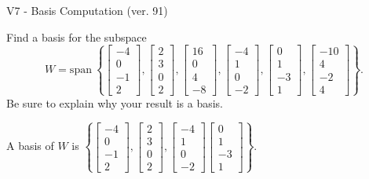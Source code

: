 \begin{exercise}
  \begin{exerciseTitle}V7 - Basis Computation (ver. 91)\end{exerciseTitle}
  \begin{exerciseStatement}
    Find a basis for the subspace 
\[W=\mathrm{span}\ \left\{\left[\begin{array}{r}
-4 \\
0 \\
-1 \\
2
\end{array}\right] , \left[\begin{array}{r}
2 \\
3 \\
0 \\
2
\end{array}\right] , \left[\begin{array}{r}
16 \\
0 \\
4 \\
-8
\end{array}\right] , \left[\begin{array}{r}
-4 \\
1 \\
0 \\
-2
\end{array}\right] , \left[\begin{array}{r}
0 \\
1 \\
-3 \\
1
\end{array}\right] , \left[\begin{array}{r}
-10 \\
4 \\
-2 \\
4
\end{array}\right]\right\}.\]
 Be sure to explain why your result is a basis.


  \end{exerciseStatement}
  \begin{exerciseAnswer}
   A basis of \(W\) is  \(\left\{\left[\begin{array}{r}
-4 \\
0 \\
-1 \\
2
\end{array}\right] , \left[\begin{array}{r}
2 \\
3 \\
0 \\
2
\end{array}\right] , \left[\begin{array}{r}
-4 \\
1 \\
0 \\
-2
\end{array}\right] \left[\begin{array}{r}
0 \\
1 \\
-3 \\
1
\end{array}\right]\right\}\).
  


  \end{exerciseAnswer}
\end{exercise}